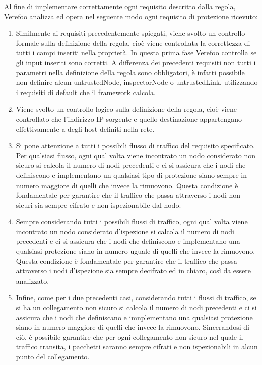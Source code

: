 Al fine di implementare correttamente ogni requisito descritto dalla regola, Verefoo analizza ed opera nel seguente modo ogni requisito di protezione ricevuto:

\begin{enumerate}
    \item  Similmente ai requisiti precedentemente spiegati, viene svolto un controllo formale sulla definizione della regola, cioè viene controllata la correttezza di tutti i campi inseriti nella proprietà. In questa prima fase
        Verefoo controlla se gli input inseriti sono corretti. A differenza dei precedenti requisiti non tutti i parametri nella definizione della regola sono obbligatori, è infatti possibile non definire alcun untrustedNode, inspectorNode o untrustedLink, 
        utilizzando i requisiti di default che il framework calcola.
    \item Viene svolto un controllo logico sulla definizione della regola, cioè viene controllato che l'indirizzo IP sorgente e quello destinazione appartengano effettivamente a degli host definiti
        nella rete.
    \item Si pone attenzione a tutti i possibili flusso di traffico del requisito specificato. Per qualsiasi flusso, ogni qual volta viene incontrato un nodo considerato non sicuro si calcola il numero di nodi precedenti e ci si assicura
        che i nodi che  definiscono e implementano un qualsiasi tipo di protezione siano  sempre in numero maggiore di quelli che invece la rimuovono. Questa condizione è fondamentale per garantire che il traffico che passa attraverso i nodi non sicuri sia 
        sempre cifrato e non ispezionabile dal nodo.
    \item Sempre considerando tutti i possibili flussi di traffico, ogni qual volta viene incontrato un nodo considerato d'ispezione si calcola il numero di nodi precedenti e ci si assicura che i nodi che definiscono  e implementano una qualsiasi protezione siano in numero uguale di quelli che invece la rimuovono.
        Questa condizione è fondamentale per garantire che il traffico che passa attraverso i nodi d'ispezione sia sempre decifrato ed in chiaro, così da essere analizzato.
    \item Infine, come per i due precedenti casi, considerando tutti i flussi di traffico, se si ha un collegamento non sicuro si calcola il numero di nodi precedenti e ci si assicura che i nodi che definiscano e imnplementano una qualsiasi protezione
        siano in numero maggiore di quelli che invece la rimuovono. Sincerandosi di ciò, è possibile garantire che per ogni collegamento non sicuro nel quale il traffico transita, i pacchetti saranno sempre cifrati e non ispezionabili in alcun punto del collegamento.
\end{enumerate}

